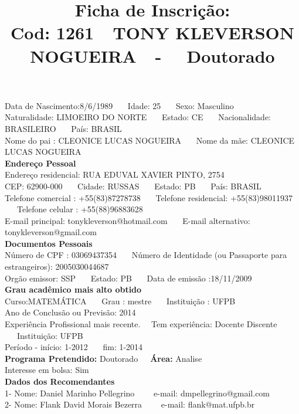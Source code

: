 \documentclass[11pt]{article}
\title{\vspace*{-4cm} Ficha de Inscrição: \\Cod: 1261\ \ TONY KLEVERSON NOGUEIRA\ \ - \ \ Doutorado 
 }
\date{}
\begin{document}
\maketitle
\vspace*{-1.5cm}
\noindent Data de Nascimento:8/6/1989
\ \ \ Idade: 25   \ \ \ Sexo: Masculino
\\
Naturalidade: LIMOEIRO DO NORTE  
\ \ \  Estado: CE
\ \ \  Nacionalidade: BRASILEIRO
\ \ \ País: BRASIL
\\        
Nome do pai : CLEONICE LUCAS NOGUEIRA
\ \ \ Nome da mãe: CLEONICE LUCAS NOGUEIRA          
\\[0.2cm]                     
\textbf{Endereço Pessoal} 
\\ 
\noindent Endereço residencial: RUA EDUVAL XAVIER PINTO, 2754
\\
        CEP: 62900-000 
\ \ \ Cidade: RUSSAS 
\ \ \ Estado: PB 
\ \ \ País: BRASIL
\\		
		Telefone comercial : +55(83)87278738
\ \ \ Telefone residencial: +55(83)98011937
\ \ \ Telefone celular : +55(88)96883628
\\
E-mail principal: tonykleverson@hotmail.com
\ \ \ E-mail alternativo: tonykleverson@gmail.com 
\\[0.2cm] 
\textbf{Documentos Pessoais}
\\
\noindent Número de CPF : 03069437354
\ \ \ Número de Identidade (ou Passaporte para estrangeiros): 2005030044687
\\
Orgão emissor: SSP
\ \ \ Estado: PB
\ \ \ Data de emissão :18/11/2009
\\[0.3cm]
\textbf{Grau acadêmico mais alto obtido}
\\	
Curso:MATEMÁTICA
\ \ \ Grau : mestre
\ \ \ Instituição : UFPB
\\			
Ano de Conclusão ou Previsão: 2014
\\ 
Experiência Profissional mais recente. \ \  
Tem experiência: Docente Discente  
\ \ \ Instituição: UFPB
\\  
Período - início: 1-2012
\ \ \ fim: 1-2014
\\[0.2cm] 
\textbf{Programa Pretendido:} Doutorado\ \ \ \textbf{Área:} Analise\\
Interesse em bolsa: Sim
\\[0.3cm]		
\textbf{Dados dos Recomendantes} 
\\
1- Nome: Daniel Marinho Pellegrino
\ \ \ \  e-mail: dmpellegrino@gmail.com 
\\
2- Nome: Flank David Morais Bezerra
\ \ \ \ e-mail: flank@mat.ufpb.br
\end{document}

